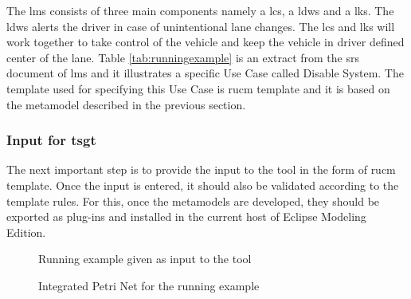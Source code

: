 The \gls{lms} consists of three main components namely a \gls{lcs}, a \gls{ldws} and a \gls{lks}. The \gls{ldws} alerts the driver in case of unintentional lane changes. The \gls{lcs} and \gls{lks} will work together to take control of the vehicle and keep the vehicle in driver defined center of the lane. Table \ref{tab:runningexample} is an extract from the \gls{srs} document of \gls{lms} and it illustrates a specific Use Case called Disable System. The template used for specifying this Use Case is \gls{rucm} template and it is based on the metamodel described in the previous section.

\subsubsection{Input for \gls{tsgt}}
The next important step is to provide the input to the tool in the form of \gls{rucm} template. Once the input is entered, it should also be validated according to the template rules. For this, once the metamodels are developed, they should be exported as plug-ins and installed in the current host of Eclipse Modeling Edition.

\begin{figure}[htb!]
\centering
{}
\caption{Running example given as input to the tool}
\label{fig:input}
\end{figure}

\begin{figure}[htb!]
\centering
{}
\caption{Integrated Petri Net for the running example}
\label{fig:integratedpn}
\end{figure}



